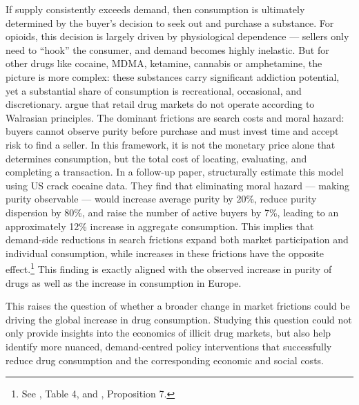 \documentclass[12pt, a4paper]{article}
\begin{document}
If supply consistently exceeds demand, then consumption is ultimately determined by the buyer's decision to seek out and purchase a substance. For opioids, this decision is largely driven by physiological dependence --- sellers only need to ``hook'' the consumer, and demand becomes highly inelastic. But for other drugs like cocaine, MDMA, ketamine, cannabis or amphetamine, the picture is more complex: these substances carry significant addiction potential, yet a substantial share of consumption is recreational, occasional, and discretionary. \citet{galenianos_2012} argue that retail drug markets do not operate according to Walrasian principles. The dominant frictions are search costs and moral hazard: buyers cannot observe purity before purchase and must invest time and accept risk to find a seller. In this framework, it is not the monetary price alone that determines consumption, but the total cost of locating, evaluating, and completing a transaction. In a follow-up paper, \citet{galenianos_2017} structurally estimate this model using US crack cocaine data. They find that eliminating moral hazard --- making purity observable --- would increase average purity by 20\%, reduce purity dispersion by 80\%, and raise the number of active buyers by 7\%, leading to an approximately 12\% increase in aggregate consumption. This implies that demand-side reductions in search frictions expand both market participation and individual consumption, while increases in these frictions have the opposite effect.\footnote{See \citet{galenianos_2017}, Table 4, and \citet{galenianos_2012}, Proposition 7.}  This finding is exactly aligned with the observed increase in purity of drugs as well as the increase in consumption in Europe.

This raises the question of whether a broader change in market frictions could be driving the global increase in drug consumption. Studying this question could not only provide insights into the economics of illicit drug markets, but also help identify more nuanced, demand-centred policy interventions that successfully reduce drug consumption and the corresponding economic and social costs.
\end{document}
